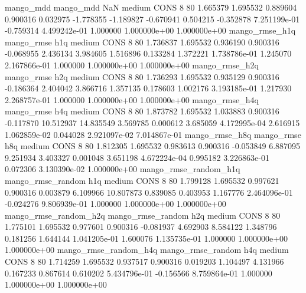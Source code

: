             mango_mdd         mango_mdd                  NaN     medium     CONS                 8 80  1.665379       1.695532 0.889604       0.900316    0.032975     -1.778355     -1.189827    -0.670941       0.504215 -0.352878 7.251199e-01    -0.759314   4.499242e-01            1.000000    1.000000e+00        1.000000e+00
       mango_rmse_h1q        mango_rmse                  h1q     medium     CONS                 8 80  1.736837       1.695532 0.936190       0.900316   -0.068955      2.436134      3.984605     1.516896       0.133284  1.372221 1.738786e-01     1.245070   2.167866e-01            1.000000    1.000000e+00        1.000000e+00
       mango_rmse_h2q        mango_rmse                  h2q     medium     CONS                 8 80  1.736293       1.695532 0.935129       0.900316   -0.186364      2.404042      3.866716     1.357135       0.178603  1.002176 3.193185e-01     1.217930   2.268757e-01            1.000000    1.000000e+00        1.000000e+00
       mango_rmse_h4q        mango_rmse                  h4q     medium     CONS                 8 80  1.873782       1.695532 1.033883       0.900316   -0.117870     10.512937     14.835549     3.569785       0.000612  3.685059 4.172995e-04     2.616915   1.062859e-02            0.044028    2.921097e-02        7.014867e-01
       mango_rmse_h8q        mango_rmse                  h8q     medium     CONS                 8 80  1.812305       1.695532 0.983613       0.900316   -0.053849      6.887095      9.251934     3.403327       0.001048  3.651198 4.672224e-04     0.995182   3.226863e-01            0.072306    3.130390e-02        1.000000e+00
mango_rmse_random_h1q mango_rmse_random                  h1q     medium     CONS                 8 80  1.799128       1.695532 0.997621       0.900316    0.003879      6.109966     10.807873     0.839085       0.403953  1.167776 2.464096e-01    -0.024276   9.806939e-01            1.000000    1.000000e+00        1.000000e+00
mango_rmse_random_h2q mango_rmse_random                  h2q     medium     CONS                 8 80  1.775101       1.695532 0.977601       0.900316   -0.081937      4.692903      8.584122     1.348796       0.181256  1.644144 1.041205e-01     1.600076   1.135735e-01            1.000000    1.000000e+00        1.000000e+00
mango_rmse_random_h4q mango_rmse_random                  h4q     medium     CONS                 8 80  1.714259       1.695532 0.937517       0.900316    0.019203      1.104497      4.131966     0.167233       0.867614  0.610202 5.434796e-01    -0.156566   8.759864e-01            1.000000    1.000000e+00        1.000000e+00
